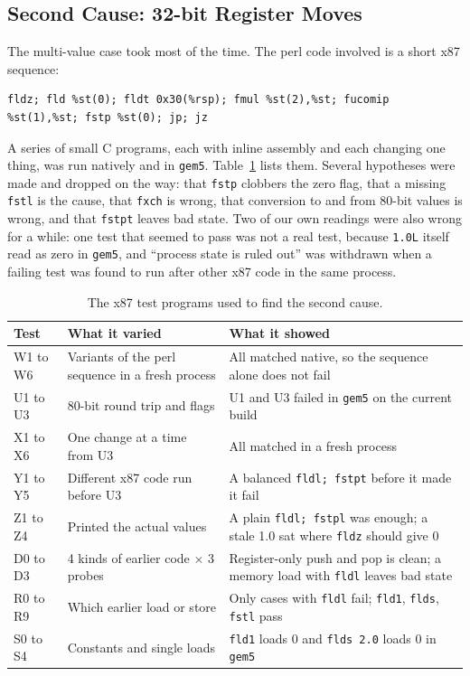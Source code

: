 \subsection{Second Cause: 32-bit Register Moves}
The multi-value case took most of the time. The perl code involved is a short x87 sequence:
\begin{lstlisting}
fldz; fld %st(0); fldt 0x30(%rsp); fmul %st(2),%st; fucomip %st(1),%st; fstp %st(0); jp; jz
\end{lstlisting}
A series of small C programs, each with inline assembly and each changing one thing, was run natively and in \texttt{gem5}. Table~\ref{tab:chr_x87tests} lists them. Several hypotheses were made and dropped on the way: that \texttt{fstp} clobbers the zero flag, that a missing \texttt{fstl} is the cause, that \texttt{fxch} is wrong, that conversion to and from 80-bit values is wrong, and that \texttt{fstpt} leaves bad state. Two of our own readings were also wrong for a while: one test that seemed to pass was not a real test, because \texttt{1.0L} itself read as zero in \texttt{gem5}, and ``process state is ruled out'' was withdrawn when a failing test was found to run after other x87 code in the same process.

\begin{table}[htbp]
\centering
\small
\caption{The x87 test programs used to find the second cause.}
\label{tab:chr_x87tests}
\begin{tabularx}{\textwidth}{l X X}
\toprule
\textbf{Test} & \textbf{What it varied} & \textbf{What it showed} \\
\midrule
W1 to W6 & Variants of the perl sequence in a fresh process & All matched native, so the sequence alone does not fail \\
U1 to U3 & 80-bit round trip and flags & U1 and U3 failed in \texttt{gem5} on the current build \\
X1 to X6 & One change at a time from U3 & All matched in a fresh process \\
Y1 to Y5 & Different x87 code run before U3 & A balanced \texttt{fldl; fstpt} before it made it fail \\
Z1 to Z4 & Printed the actual values & A plain \texttt{fldl; fstpl} was enough; a stale 1.0 sat where \texttt{fldz} should give 0 \\
D0 to D3 & 4 kinds of earlier code $\times$ 3 probes & Register-only push and pop is clean; a memory load with \texttt{fldl} leaves bad state \\
R0 to R9 & Which earlier load or store & Only cases with \texttt{fldl} fail; \texttt{fld1}, \texttt{flds}, \texttt{fstl} pass \\
S0 to S4 & Constants and single loads & \texttt{fld1} loads 0 and \texttt{flds 2.0} loads 0 in \texttt{gem5} \\
\bottomrule
\end{tabularx}
\end{table}

